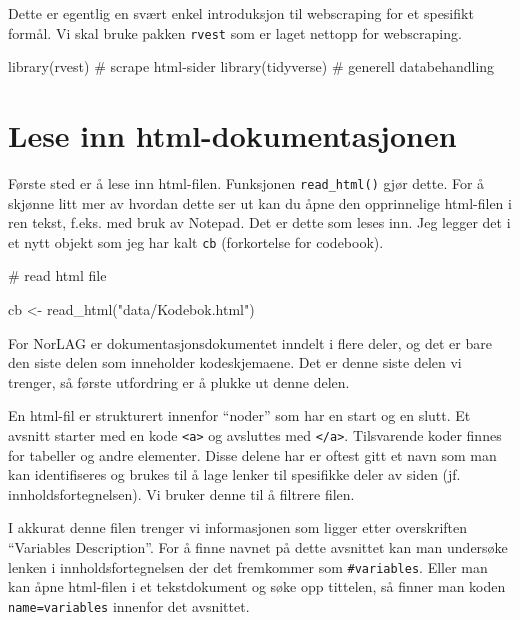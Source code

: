 \documentclass[
  norsk,
  letterpaper,
  DIV=11,
  numbers=noendperiod]{scrreprt}
\newenvironment{Shaded}{\begin{snugshade}}{\end{snugshade}}
\newcommand{\CommentTok}[1]{\textcolor[rgb]{0.37,0.37,0.37}{#1}}
\newcommand{\FunctionTok}[1]{\textcolor[rgb]{0.28,0.35,0.67}{#1}}
\newcommand{\NormalTok}[1]{\textcolor[rgb]{0.00,0.23,0.31}{#1}}
\newcommand{\OtherTok}[1]{\textcolor[rgb]{0.00,0.23,0.31}{#1}}
\newcommand{\StringTok}[1]{\textcolor[rgb]{0.13,0.47,0.30}{#1}}
\theoremstyle{definition}
\theoremstyle{remark}
\begin{document}
Dette er egentlig en svært enkel introduksjon til webscraping for et
spesifikt formål. Vi skal bruke pakken \texttt{rvest} som er laget
nettopp for webscraping.

\begin{Shaded}
\begin{Highlighting}[]
\FunctionTok{library}\NormalTok{(rvest)       }\CommentTok{\# scrape html{-}sider}
\FunctionTok{library}\NormalTok{(tidyverse)   }\CommentTok{\# generell databehandling}
\end{Highlighting}
\end{Shaded}

\section{Lese inn
html-dokumentasjonen}\label{lese-inn-html-dokumentasjonen}

Første sted er å lese inn html-filen. Funksjonen \texttt{read\_html()}
gjør dette. For å skjønne litt mer av hvordan dette ser ut kan du åpne
den opprinnelige html-filen i ren tekst, f.eks. med bruk av Notepad. Det
er dette som leses inn. Jeg legger det i et nytt objekt som jeg har kalt
\texttt{cb} (forkortelse for codebook).

\begin{Shaded}
\begin{Highlighting}[]
\CommentTok{\# read html file}

\NormalTok{cb }\OtherTok{\textless{}{-}} \FunctionTok{read\_html}\NormalTok{(}\StringTok{"data/Kodebok.html"}\NormalTok{)}
\end{Highlighting}
\end{Shaded}

For NorLAG er dokumentasjonsdokumentet inndelt i flere deler, og det er
bare den siste delen som inneholder kodeskjemaene. Det er denne siste
delen vi trenger, så første utfordring er å plukke ut denne delen.

En html-fil er strukturert innenfor ``noder'' som har en start og en
slutt. Et avsnitt starter med en kode
\texttt{\textless{}a\textgreater{}} og avsluttes med
\texttt{\textless{}/a\textgreater{}}. Tilsvarende koder finnes for
tabeller og andre elementer. Disse delene har er oftest gitt et navn som
man kan identifiseres og brukes til å lage lenker til spesifikke deler
av siden (jf. innholdsfortegnelsen). Vi bruker denne til å filtrere
filen.

I akkurat denne filen trenger vi informasjonen som ligger etter
overskriften ``Variables Description''. For å finne navnet på dette
avsnittet kan man undersøke lenken i innholdsfortegnelsen der det
fremkommer som \texttt{\#variables}. Eller man kan åpne html-filen i et
tekstdokument og søke opp tittelen, så finner man koden
\texttt{name=\textquotesingle{}variables} innenfor det avsnittet.
\end{document}
